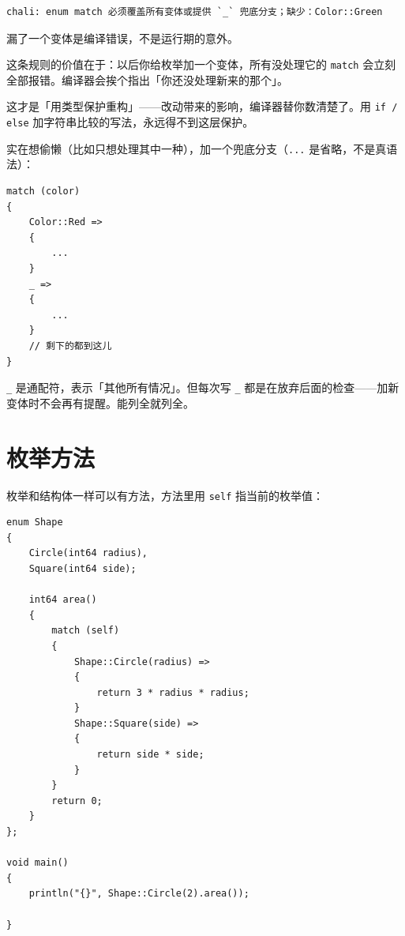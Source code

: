 \par
\medskip
\begin{lstlisting}[style=out]
chali: enum match 必须覆盖所有变体或提供 `_` 兜底分支；缺少：Color::Green
\end{lstlisting}
\par
\medskip

漏了一个变体是编译错误，不是运行期的意外。

这条规则的价值在于：以后你给枚举加一个变体，所有没处理它的 \texttt{match} 会立刻全部报错。编译器会挨个指出「你还没处理新来的那个」。

这才是「用类型保护重构」——改动带来的影响，编译器替你数清楚了。用 \texttt{if /\allowbreak{} else} 加字符串比较的写法，永远得不到这层保护。

实在想偷懒（比如只想处理其中一种），加一个兜底分支（\texttt{.\allowbreak{}.\allowbreak{}.\allowbreak{}} 是省略，不是真语法）：

\par
\medskip
\begin{lstlisting}[style=chali]
match (color)
{
    Color::Red =>
    {
        ...
    }
    _ =>
    {
        ...
    }
    // 剩下的都到这儿
}
\end{lstlisting}
\par
\medskip

\texttt{\_} 是通配符，表示「其他所有情况」。但每次写 \texttt{\_} 都是在放弃后面的检查——加新变体时不会再有提醒。能列全就列全。

\section{枚举方法}

枚举和结构体一样可以有方法，方法里用 \texttt{self} 指当前的枚举值：

\par
\medskip
\begin{lstlisting}[style=chali]
enum Shape
{
    Circle(int64 radius),
    Square(int64 side);

    int64 area()
    {
        match (self)
        {
            Shape::Circle(radius) =>
            {
                return 3 * radius * radius;
            }
            Shape::Square(side) =>
            {
                return side * side;
            }
        }
        return 0;
    }
};

void main()
{
    println("{}", Shape::Circle(2).area());

}
\end{lstlisting}
\par
\medskip

